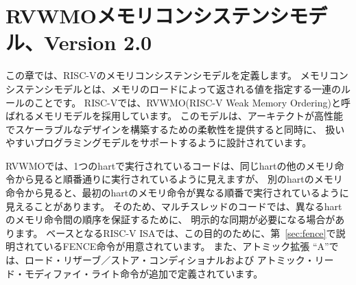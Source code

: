 \begin{comment}
\chapter{RVWMO Memory Consistency Model, Version 2.0}
\end{comment}
\chapter{RVWMOメモリコンシステンシモデル、Version 2.0}
\label{ch:memorymodel}

\begin{comment}
This chapter defines the RISC-V memory consistency model.
A memory consistency model is a set of rules specifying the values that can be returned by loads of memory.
RISC-V uses a memory model called ``RVWMO'' (RISC-V Weak Memory Ordering) which is designed to provide flexibility for architects to build high-performance scalable designs while simultaneously supporting a tractable programming model.
\end{comment}

この章では、RISC-Vのメモリコンシステンシモデルを定義します。
メモリコンシステンシモデルとは、メモリのロードによって返される値を指定する一連のルールのことです。
RISC-Vでは、RVWMO(RISC-V Weak Memory Ordering)と呼ばれるメモリモデルを採用しています。
このモデルは、アーキテクトが高性能でスケーラブルなデザインを構築するための柔軟性を提供すると同時に、
扱いやすいプログラミングモデルをサポートするように設計されています。

\begin{comment}
Under RVWMO, code running on a single hart appears to execute in order from the perspective of other memory instructions in the same hart, but memory instructions from another hart may observe the memory instructions from the first hart being executed in a different order.
Therefore, multithreaded code may require explicit synchronization to guarantee ordering between memory instructions from different harts.
The base RISC-V ISA provides a FENCE instruction for this purpose, described in Section~\ref{sec:fence}, while the atomics extension ``A'' additionally defines load-reserved/store-conditional and atomic read-modify-write instructions.
\end{comment}

RVWMOでは、1つのhartで実行されているコードは、同じhartの他のメモリ命令から見ると順番通りに実行されているように見えますが、
別のhartのメモリ命令から見ると、最初のhartのメモリ命令が異なる順番で実行されているように見えることがあります。
そのため、マルチスレッドのコードでは、異なるhartのメモリ命令間の順序を保証するために、
明示的な同期が必要になる場合があります。
ベースとなるRISC-V ISAでは、この目的のために、第~\ref{sec:fence}で説明されているFENCE命令が用意されています。
また、アトミック拡張 ``A''では、ロード・リザーブ／ストア・コンディショナルおよび
アトミック・リード・モディファイ・ライト命令が追加で定義されています。

